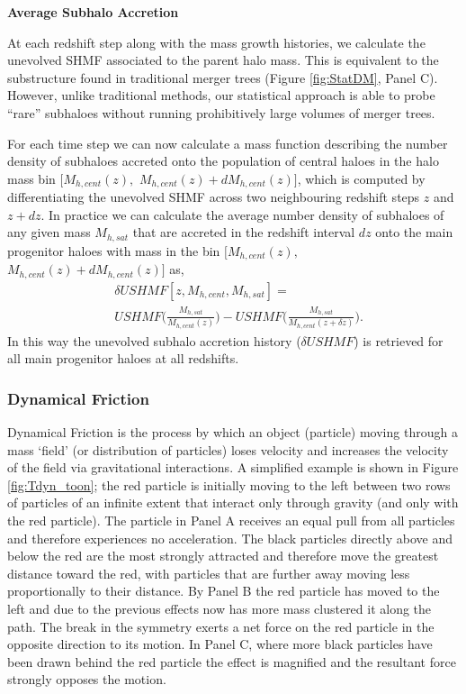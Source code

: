 \textbf{Average Subhalo Accretion}

At each redshift step along with the mass growth histories, we calculate the unevolved SHMF associated to the parent halo mass. This is equivalent to the substructure found in traditional merger trees (Figure \ref{fig:StatDM}, Panel C). However, unlike traditional methods, our statistical approach is able to probe ``rare'' subhaloes without running prohibitively large volumes of merger trees.

For each time step we can now calculate a mass function describing the number density of subhaloes accreted onto the population of central haloes in the halo mass bin $[M_{h,cent}(z),$ $M_{h,cent}(z) + dM_{h,cent}(z)]$, which is computed by differentiating the unevolved SHMF across two neighbouring redshift steps $z$ and $z+dz$. In practice we can calculate the average number density of subhaloes of any given mass $M_{h, sat}$ that are accreted in the redshift interval $dz$ onto the main progenitor haloes with mass in the bin $[M_{h,cent}(z),$ $M_{h,cent}(z) + dM_{h,cent}(z)]$ as,
\begin{equation}
\label{eqn:deltSHMF}
\begin{split}
&\delta USHMF[z, M_{h,cent},M_{h,sat}] =  \\
&USHMF\Big(\frac{M_{h,sat}}{M_{h,cent}(z)}\Big) - USHMF\Big(\frac{M_{h,sat}}{M_{h,cent}(z + \delta z)}\Big).
\end{split}
\end{equation}
In this way the unevolved subhalo accretion history ($\delta USHMF$) is retrieved for all main progenitor haloes at all redshifts.

\subsubsection{Dynamical Friction}
\label{subsub:DynF}
Dynamical Friction is the process by which an object (particle) moving through a mass `field' (or distribution of particles) loses velocity and increases the velocity of the field via gravitational interactions. A simplified example is shown in Figure \ref{fig:Tdyn_toon}; the red particle is initially moving to the left between two rows of particles of an infinite extent that interact only through gravity (and only with the red particle). The particle in Panel A receives an equal pull from all particles and therefore experiences no acceleration. The black particles directly above and below the red are the most strongly attracted and therefore move the greatest distance toward the red, with particles that are further away moving less proportionally to their distance. By Panel B the red particle has moved to the left and due to the previous effects now has more mass clustered it along the path. The break in the symmetry exerts a net force on the red particle in the opposite direction to its motion. In Panel C, where more black particles have been drawn behind the red particle the effect is magnified and the resultant force strongly opposes the motion. 

